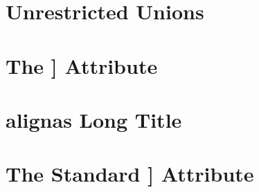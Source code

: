 \section[Unrestricted Unions\hspace*{1em}(Long Title)]{Unrestricted Unions}\label{unrestricted-unions}


\newpage
\section*{The {\SecCode [[noreturn]]} Attribute\sectionmark{{\tt[[noreturn]]}}}\label{the-noreturn-attribute}\sectionmark{{\tt[[noreturn]]}}


\newpage
\section[\tt{alignas}]{{\SecCode alignas} Long Title}\label{alignas}


\newpage
\section[{\tt [[deprecated]]}]{The Standard {\SecCode [[deprecated]]} Attribute\sectionmark{{\RHCode [[deprecated]]}}}\label{deprecated}\label{the-standard-[[deprecated]]-attribute}\sectionmark{{\RHCode [[deprecated]]}}



%
%
%
%
%
%
%
%
%
%


